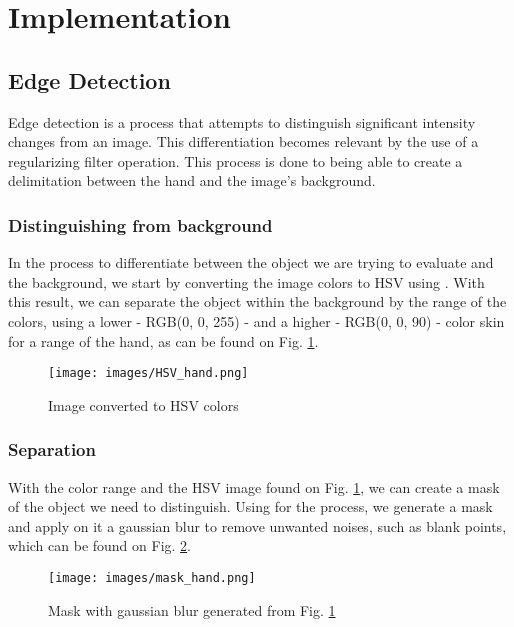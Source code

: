 \documentclass[conference]{IEEEtran}
\begin{document}
\section{Implementation}

\subsection{Edge Detection}
Edge detection is a process that attempts to distinguish significant intensity changes from an image. This differentiation becomes relevant by the use of a regularizing filter operation. This process is done to being able to create a delimitation between the hand and the image's background.

\subsubsection{Distinguishing from background}
In the process to differentiate between the object we are trying to evaluate and the background, we start by converting the image colors to HSV using \cite{cv2}. With this result, we can separate the object within the background by the range of the colors, using a lower - RGB(0, 0, 255) - and a higher - RGB(0, 0, 90) - color skin for a range of the hand, as can be found on Fig. \ref{HSV_hand}.

\begin{figure}[htbp]
\centerline{\texttt{[image: images/HSV\_hand.png]}}
\caption{Image converted to HSV colors}
\label{HSV_hand}
\end{figure}

\subsubsection{Separation}
With the color range and the HSV image found on Fig. \ref{HSV_hand}, we can create a mask of the object we need to distinguish. Using \cite{cv2} for the process, we generate a mask and apply on it a gaussian blur to remove unwanted noises, such as blank points, which can be found on Fig. \ref{mask_hand}.

\begin{figure}[htbp]
\centerline{\texttt{[image: images/mask\_hand.png]}}
\caption{Mask with gaussian blur generated from Fig. \ref{HSV_hand}}
\label{mask_hand}
\end{figure}
\end{document}
